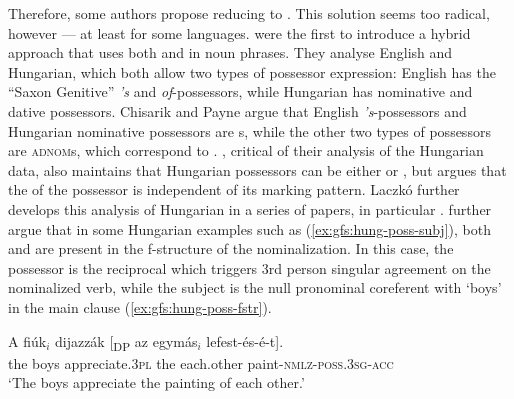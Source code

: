 \documentclass[output=paper]{../langscibook}
\begin{document}
 Therefore, some authors propose reducing \POSS to \SUBJ \citep{sulger2015}. This solution seems too radical, however --- at least for some languages. \citet{ChisaPayn03} were the first to introduce a hybrid approach that uses both \SUBJ and \POSS in noun phrases. They analyse English and Hungarian, which both allow two types of possessor expression: English has the ``Saxon Genitive'' \textit{'s} and \textit{of}-possessors, while Hungarian has nominative and dative possessors. Chisarik and Payne argue that English \textit{'s}-possessors and Hungarian nominative possessors are {\SUBJ}s, while the other two types of possessors are \textsc{adnom}s, which correspond to \POSS. \citet{Laczko2004}, critical of their analysis of the Hungarian data, also maintains that Hungarian possessors can be either \SUBJ or \POSS, but argues that the \GF of the possessor is independent of its marking pattern. Laczkó further develops this analysis of Hungarian in a series of papers, in particular  \citet{Laczko2009,Laczko17}. \citet{LaczkoRakosi2019} further argue that in some Hungarian examples such as (\ref{ex:gfs:hung-poss-subj}), both \SUBJ and \POSS are present in the f-structure of the nominalization. In this case, the possessor is the reciprocal which triggers 3rd person singular agreement on the nominalized verb, while the subject is the null pronominal coreferent with `boys' in the main clause (\ref{ex:gfs:hung-poss-fstr}).
 
 \ea\label{ex:gfs:hung-poss-subj}
 \gll A fiúk$_i$ dijazzák [\textsubscript{DP} az egymás$_i$ lefest-és-é-t].\\
 the boys appreciate.\textsc{3pl} {} the each.other paint-\textsc{nmlz-poss.3sg-acc}\\
 \trans `The boys appreciate the painting of each other.' \citep[163]{LaczkoRakosi2019}
 \z

 
\end{document}
